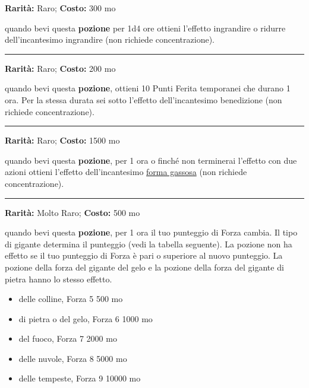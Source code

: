 \begin{multicols}{2}
\textbf{Rarità:} Raro; \textbf{Costo:} 300 mo

quando bevi questa \textbf{pozione} per 1d4 ore ottieni l'effetto ingrandire o ridurre dell'incantesimo ingrandire (non richiede concentrazione).

\smallskip\noindent\rule{\linewidth}{2pt}  \hypertarget{PozionediEroismo}{}\smallskip{}\noindent\label{PozionediEroismo}

\textbf{Rarità:} Raro; \textbf{Costo:} 200 mo

quando bevi questa \textbf{pozione}, ottieni 10 Punti Ferita temporanei che durano 1 ora. Per la stessa durata sei sotto l'effetto dell'incantesimo benedizione (non richiede concentrazione).

\smallskip\noindent\rule{\linewidth}{2pt}  \hypertarget{PozionediFormaGassosa}{}\smallskip{}\noindent\label{PozionediFormaGassosa}

\textbf{Rarità:} Raro; \textbf{Costo:} 1500 mo

quando bevi questa \textbf{pozione}, per 1 ora o finché non terminerai l'effetto con due azioni ottieni l'effetto dell'incantesimo \hyperlink{PozionediFormaGassosa}{forma gassosa} (non richiede concentrazione).

\smallskip\noindent\rule{\linewidth}{2pt}  \hypertarget{PozionediForzadeiGiganti}{}\smallskip{}\noindent\label{PozionediForzadeiGiganti}

\textbf{Rarità:} Molto Raro; \textbf{Costo:} 500 mo

quando bevi questa \textbf{pozione}, per 1 ora il tuo punteggio di Forza cambia. Il tipo di gigante determina il punteggio (vedi la tabella seguente). La pozione non ha effetto se il tuo punteggio di Forza è pari o superiore al nuovo punteggio. La pozione della forza del gigante del gelo e la pozione della forza del gigante di pietra hanno lo stesso effetto.

\begin{itemize} \setlength\itemsep{0em}
\item delle colline, Forza 5 500 mo
\item di pietra o del gelo, Forza 6 1000 mo
\item del fuoco, Forza 7 2000 mo
\item delle nuvole, Forza 8 5000 mo
\item delle tempeste, Forza 9 10000 mo
\end{itemize}


\end{multicols}
